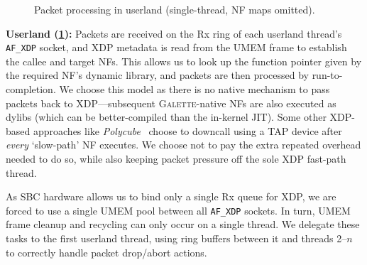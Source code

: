 \documentclass[comsoc, conference, times]{IEEEtran}
\newcommand{\ourtech}{\textsc{Galette}}
\newcommand{\afxdp}{\texttt{AF\_XDP}}
\newcommand{\fakepara}[1]{\noindent\textbf{#1:}}
\begin{document}

\begin{figure}
	\centering
	\resizebox{0.8\linewidth}{!}{}
	\caption{Packet processing in userland (single-thread, NF maps omitted).\label{fig:dplane-user}}
\end{figure}

\fakepara{Userland (\cref{fig:dplane-user})}
Packets are received on the Rx ring of each userland thread's \afxdp{} socket, and XDP metadata is read from the UMEM frame to establish the callee and target NFs.
This allows us to look up the function pointer given by the required NF's dynamic library, and packets are then processed by run-to-completion.
We choose this model as there is no native mechanism to pass packets back to XDP---subsequent \ourtech-native NFs are also executed as dylibs (which can be better-compiled than the in-kernel JIT).
Some other XDP-based approaches like \emph{Polycube}~\parencite{DBLP:journals/tnsm/MianoRBBL21} choose to downcall using a TAP device after \emph{every} `slow-path' NF executes. 
We choose not to pay the extra repeated overhead needed to do so, while also keeping packet pressure off the sole XDP fast-path thread.

As SBC hardware allows us to bind only a single Rx queue for XDP, we are forced to use a single UMEM pool between all \afxdp{} sockets.
In turn, UMEM frame cleanup and recycling can only occur on a single thread.
We delegate these tasks to the first userland thread, using ring buffers between it and threads 2--$n$ to correctly handle packet drop/abort actions.


%
%
%
%
%
\end{document}
